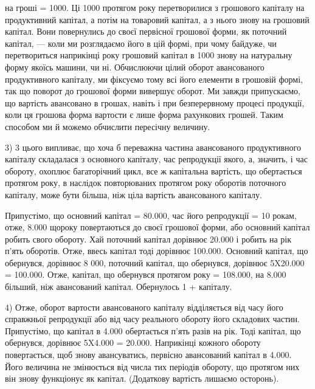 \parcont{}  %
на гроші  = 1000. Ці 1000 протягом року
перетворилися з грошового капіталу на продуктивний капітал, а потім на
товаровий капітал, а з нього знову на грошовий капітал. Вони повернулись
до своєї первісної грошової форми, як поточний капітал, — коли ми
розглядаємо його в цій формі, при чому байдуже, чи перетвориться наприкінці
року грошовий капітал в 1000 знову на натуральну
форму якоїсь машини, чи ні. Обчислюючи цілий оборот авансованого продуктивного
капіталу, ми фіксуємо тому всі його елементи в грошовій формі,
так що поворот до грошової форми вивершує оборот. Ми завжди припускаємо,
що вартість авансовано в грошах, навіть і при безперервному
процесі продукції, коли ця грошова форма вартости є лише форма
рахункових грошей. Таким способом ми й можемо обчислити пересічну
величину.

3) 3 цього випливає, що хоча б переважна частина авансованого
продуктивного капіталу складалася з основного капіталу, час репродукції
якого, а, значить, і час обороту, охоплює багаторічний цикл, все ж капітальна
вартість, що обертається протягом року, в наслідок повторюваних
протягом року оборотів поточного капіталу, може бути більша, ніж ціла
вартість авансованого капіталу.

Припустімо, що основний капітал = \num{80.000}, час його репродукції
= 10 рокам, отже, \num{8.000} щороку повертаються до своєї
грошової форми, або основний капітал робить  свого обороту. Хай
поточний капітал дорівнює \num{20.000} і робить на рік п’ять оборотів.
Отже, ввесь капітал тоді дорівнює \num{100.000}. Основний
капітал, що обернувся, дорівнює 8 000, поточний капітал, що
обернувся, дорівнює 5X\num{20.000} = \num{100.000}. Отже, капітал, що
обернувся протягом року = \num{108.000}, на \num{8.000} більший,
ніж авансований капітал. Обернулось 1 +  капіталу.

4) Отже, оборот вартости авансованого капіталу відділяється
від часу його справжньої репродукції або від часу реального обороту
його складових частин. Припустімо, що капітал в \num{4.000} обертається
п’ять разів на рік. Тоді капітал, що обернувся, дорівнює
5X\num{4.000} = \num{20.000}. Наприкінці кожного обороту повертається,
щоб знову авансуватись, первісно авансований капітал в \num{4.000}.
Його величина не змінюється від числа тих періодів обороту, що
протягом них він знову функціонує як капітал. (Додаткову вартість
лишаємо осторонь).

